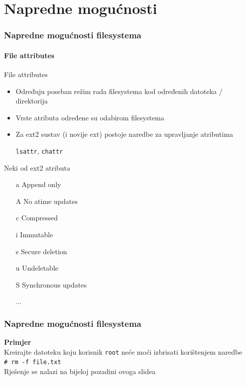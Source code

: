 \documentclass[t]{beamer}
\begin{document}
\section{Napredne mogućnosti}
\begin{frame}
	\frametitle{Napredne mogućnosti filesystema}
	\framesubtitle{File attributes}
	File attributes
	\begin{itemize}
		\item Određuju poseban režim rada filesystema kod određenih datoteka / direktorija
		\item Vrste atributa određene su odabirom filesystema
		\item Za ext2 sustav (i novije ext) postoje naredbe za upravljanje atributima
		\item[] \texttt{lsattr}, \texttt{chattr}
	\end{itemize}
	\vspace{1em}
	Neki od ext2 atributa
	\begin{multicols}{2}
		\begin{itemize}
			\item[a] Append only
			\item[A] No atime updates
			\item[c] Compressed
			\item[i] Immutable
			\item[s] Secure deletion
			\item[u] Undeletable
			\item[S] Synchronous updates
			\item[] ...
		\end{itemize}
	\end{multicols}
\end{frame}

\begin{frame}[fragile]
	\frametitle{Napredne mogućnosti filesystema}
	\textbf{Primjer}\\
	\vspace{1em}
	Kreirajte datoteku koju korisnik \texttt{root} neće moći izbrisati korištenjem naredbe\\
	\verb|# rm -f file.txt|\\
	\vspace{1em}
	{\footnotesize Rješenje se nalazi na bijeloj pozadini ovoga slidea}\\
	\vfill
	\textcolor{white}{Postaviti immutable atribut}
\end{frame}
\end{document}
